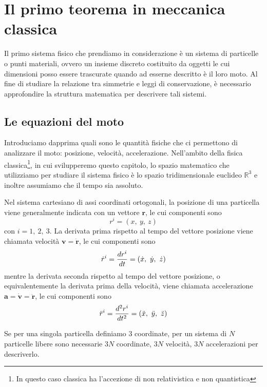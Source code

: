 \chapter{Il primo teorema in meccanica classica}
    
    Il primo sistema fisico che prendiamo in considerazione è un sistema di particelle o punti materiali, ovvero un insieme discreto costituito da oggetti le cui dimensioni posso essere trascurate quando ad esserne descritto è il loro moto. Al fine di studiare la relazione tra simmetrie e leggi di conservazione, è necessario approfondire la struttura matematica per descrivere tali sistemi. 

\section{Le equazioni del moto}
    
    Introduciamo dapprima quali sono le quantità fisiche che ci permettono di analizzare il moto: posizione, velocità, accelerazione. Nell'ambito della fisica classica\footnote{In questo caso classica ha l'accezione di non relativistica e non quantistica}, in cui svilupperemo questo capitolo, lo spazio matematico che utilizziamo per studiare il sistema fisico è lo spazio tridimensionale euclideo $\mathbb R^3$ e inoltre assumiamo che il tempo sia assoluto.
    
    Nel sistema cartesiano di assi coordinati ortogonali, la posizione di una particella viene generalmente indicata con un vettore $\mathbf r$, le cui componenti sono 
    \begin{equation*}
        r^i = (x, ~y, ~z)
    \end{equation*}
    con $i = 1, ~2, ~3$. La derivata prima rispetto al tempo del vettore posizione viene chiamata velocità $\mathbf v = \mathbf {\dot r}$, le cui componenti sono 
    \begin{equation*}
        \dot r^i = \frac{dr^i}{dt} = (\dot x, ~\dot y, ~\dot z)
    \end{equation*}
    mentre la derivata seconda rispetto al tempo del vettore posizione, o equivalentemente la derivata prima della velocità, viene chiamata accelerazione $\mathbf a = \mathbf{\dot v} = \mathbf{\ddot r}$, le cui componenti sono 
    \begin{equation*}
        \ddot r^i = \frac{d^2r^i}{dt^2} = (\ddot x, ~\ddot y, ~\ddot z)
    \end{equation*}
    
    Se per una singola particella definiamo $3$ coordinate, per un sistema di $N$ particelle libere sono necessarie $3N$ coordinate, $3N$ velocità, $3N$ accelerazioni per descriverlo. 
    
